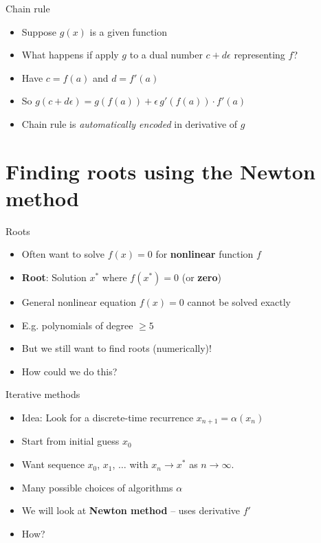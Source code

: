 \begin{frame}{Chain rule}
\protect\hypertarget{chain-rule}{}

\begin{itemize}
\item
  Suppose \(g(x)\) is a given function
\item
  What happens if apply \(g\) to a dual number \(c + d \epsilon\)
  representing \(f\)?
\item
  Have \(c = f(a)\) and \(d = f'(a)\)
\item
  So \(g(c + d\epsilon) = g(f(a)) + \epsilon \, g'(f(a)) \cdot f'(a)\)
\item
  Chain rule is \emph{automatically encoded} in derivative of \(g\)
\end{itemize}

\end{frame}

\hypertarget{finding-roots-using-the-newton-method}{%
\section{Finding roots using the Newton
method}\label{finding-roots-using-the-newton-method}}

\begin{frame}{Roots}
\protect\hypertarget{roots}{}

\begin{itemize}
\item
  Often want to solve \(f(x) = 0\) for \textbf{nonlinear} function \(f\)
\item
  \textbf{Root}: Solution \(x^*\) where \(f(x^*) = 0\) (or
  \textbf{zero})
\item
  General nonlinear equation \(f(x) = 0\) cannot be solved exactly
\item
  E.g. polynomials of degree \(\ge 5\)
\item
  But we still want to find roots (numerically)!
\item
  How could we do this?
\end{itemize}

\end{frame}

\begin{frame}{Iterative methods}
\protect\hypertarget{iterative-methods}{}

\begin{itemize}
\item
  Idea: Look for a discrete-time recurrence \(x_{n+1} = \alpha(x_n)\)
\item
  Start from initial guess \(x_0\)
\item
  Want sequence \(x_0\), \(x_1\), \(\ldots\) with \(x_n \to x^{*}\) as
  \(n \to \infty\).
\item
  Many possible choices of algorithms \(\alpha\)
\item
  We will look at \textbf{Newton method} -- uses derivative \(f'\)
\item
  How?
\end{itemize}

\end{frame}

